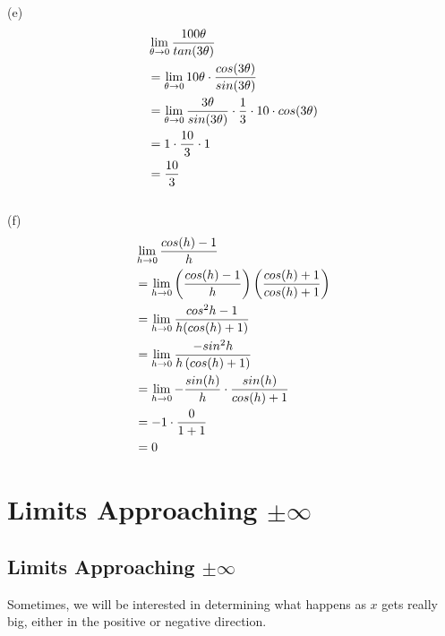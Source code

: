 \begin{exercise}
	(e)
	\begin{align}
		 & \lim\limits_{\theta \rightarrow 0}{100\theta \over tan(3\theta)}                                                 \\
		 & = \lim\limits_{\theta \rightarrow 0}{10\theta \cdot {cos(3\theta) \over sin(3\theta)}}                           \\
		 & = \lim\limits_{\theta \rightarrow 0}{{3\theta \over sin(3\theta)} \cdot {1 \over 3} \cdot 10 \cdot cos(3\theta)} \\
		 & = 1 \cdot {10 \over 3} \cdot 1                                                                                   \\
		 & = {10 \over 3}
	\end{align}
	\\

	(f)
	\begin{align}
		 & \lim\limits_{h \rightarrow 0}{cos(h)-1 \over h}                                                        \\
		 & = \lim\limits_{h \rightarrow 0}{\left({cos(h)-1 \over h}\right)\left({cos(h)+1 \over cos(h)+1}\right)} \\
		 & = \lim\limits_{h \rightarrow 0}{cos^2h - 1 \over h(cos(h) + 1)}                                        \\
		 & = \lim\limits_{h \rightarrow 0}{-sin^2h \over h\left(cos(h) + 1\right)}                                \\
		 & = \lim\limits_{h \rightarrow 0}{-{sin(h) \over h} \cdot {sin(h) \over cos(h) + 1}}                     \\
		 & = -1 \cdot {0 \over 1+1}                                                                               \\
		 & = 0
	\end{align}
\end{exercise}

\chapter{Limits Approaching $ \pm \infty $}

\section{Limits Approaching $ \pm \infty $}

Sometimes, we will be interested in determining what happens as $ x $ gets really big, either in the positive or negative direction. \\

